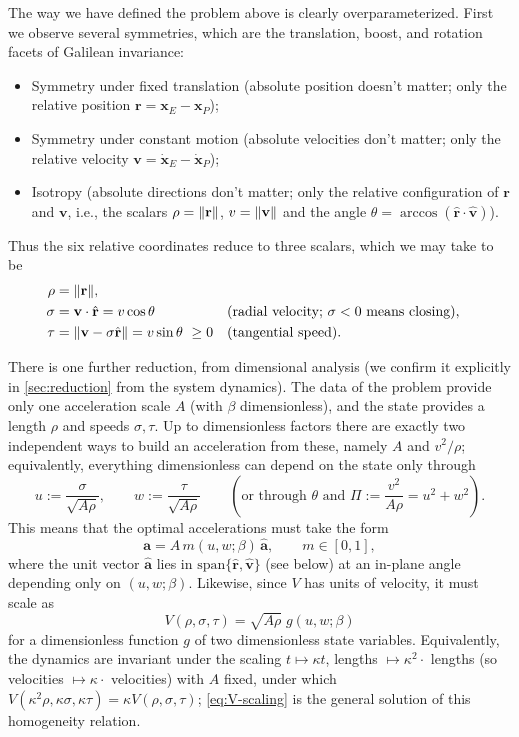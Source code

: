 \documentclass{article}
\newcommand{\eqdef}{:=}
\renewcommand{\vec}[1]{\mathbf{#1}}
\theoremstyle{remark}
\begin{document}
The way we have defined the problem above is clearly overparameterized.  First
we observe several symmetries, which are the translation, boost, and rotation
facets of Galilean invariance:
\begin{itemize}
\item Symmetry under fixed translation (absolute position doesn't matter; only the relative
  position $\vec{r} = \vec{x}_E - \vec{x}_P$);
\item Symmetry under constant motion (absolute velocities don't matter; only
  the relative velocity $\vec{v} = \dot{\vec{x}}_E - \dot{\vec{x}}_P$);
\item Isotropy (absolute directions don't matter; only the relative
  configuration of $\vec r$ and $\vec v$, i.e., the scalars $\rho = \norm{\vec
    r}$, $v = \norm{\vec v}$ and the angle
  $\theta = \arccos(\hat{\vec r}\cdot\hat{\vec v})$).
\end{itemize}
Thus the six relative coordinates reduce to three scalars, which we may take
to be
\begin{align*}
  \rho &= \norm{\vec r}, \\
  \sigma &= \vec v \cdot \hat{\vec r} = v \cos\theta
  && \text{(radial velocity; $\sigma < 0$ means closing)}, \\
  \tau &= \norm{\vec v - \sigma \hat{\vec r}} = v \sin\theta \ \ge 0
  && \text{(tangential speed)}.
\end{align*}

There is one further reduction, from dimensional analysis (we confirm it
explicitly in \cref{sec:reduction} from the system dynamics).  The data of the
problem provide only one acceleration scale $A$ (with $\beta$ dimensionless),
and the state provides a length $\rho$ and speeds $\sigma, \tau$.  Up to
dimensionless factors there are exactly two independent ways to build an
acceleration from these, namely $A$ and $v^2/\rho$; equivalently, everything
dimensionless can depend on the state only through
\[
  u \eqdef \frac{\sigma}{\sqrt{A \rho}}, \qquad
  w \eqdef \frac{\tau}{\sqrt{A \rho}}
  \qquad \left(\text{or through } \theta \text{ and } \Pi \eqdef
    \frac{v^2}{A\rho} = u^2 + w^2 \right).
\]
This means that the optimal accelerations must take the form
\[
  \vec a = A \, m(u, w; \beta)\, \hat{\vec a}, \qquad m \in [0, 1],
\]
where the unit vector $\hat{\vec a}$ lies in $\mathrm{span}\{\hat{\vec r},
\hat{\vec v}\}$ (see below) at an in-plane angle depending only on $(u, w;
\beta)$.  Likewise, since $V$ has units of velocity, it must scale as
\begin{equation}
  \label{eq:V-scaling}
  V(\rho, \sigma, \tau) = \sqrt{A \rho}\; g(u, w; \beta)
\end{equation}
for a dimensionless function $g$ of two dimensionless state variables.
Equivalently, the dynamics are invariant under the scaling $t \mapsto \kappa
t$, lengths $\mapsto \kappa^2 \cdot$ lengths (so velocities $\mapsto \kappa
\cdot$ velocities) with $A$ fixed, under which $V(\kappa^2\rho, \kappa\sigma,
\kappa\tau) = \kappa V(\rho,\sigma,\tau)$; \cref{eq:V-scaling} is the general
solution of this homogeneity relation.
\end{document}
